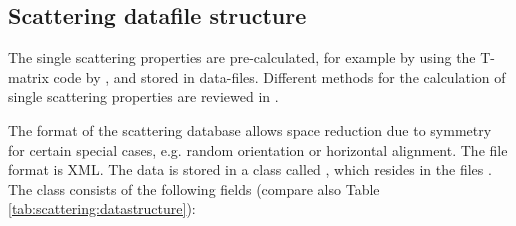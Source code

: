 \subsection{Scattering datafile structure}
\label{sec:clouds:ARTS_SSP_structure}
 
The single scattering properties are pre-calculated, for example by
using the T-matrix 
code by \citet{Mishchenko:02}, and stored in data-files. Different
methods for the calculation of single scattering properties are
reviewed in \citet{emde05:_phdthesis}. 

The format of the scattering database allows space reduction due to
symmetry for certain special cases, e.g. random orientation or
horizontal alignment. The file format is XML. The data is stored in a
class called , which resides in
the files . The class consists of the
following 
fields (compare also Table \ref{tab:scattering:datastructure}):

